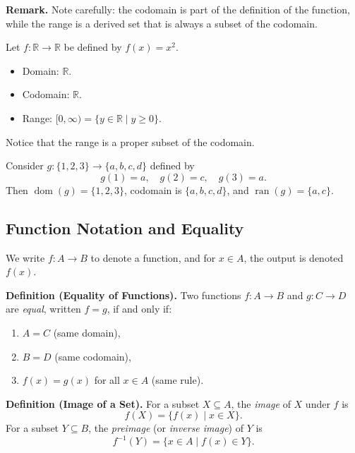 \documentclass[11pt,a4paper]{article}
\begin{document}
\textbf{Remark.} Note carefully: the codomain is part of the definition of the function, while the range is a derived set that is always a subset of the codomain.

\begin{example}
Let $f: \mathbb{R} \to \mathbb{R}$ be defined by $f(x) = x^2$.
\begin{itemize}[label=--]
    \item Domain: $\mathbb{R}$.
    \item Codomain: $\mathbb{R}$.
    \item Range: $[0, \infty) = \{y \in \mathbb{R} \mid y \geq 0\}$.
\end{itemize}
Notice that the range is a proper subset of the codomain.
\end{example}

\begin{example}
Consider $g: \{1, 2, 3\} \to \{a, b, c, d\}$ defined by
\begin{equation*}
    g(1) = a, \quad g(2) = c, \quad g(3) = a.
\end{equation*}
Then $\operatorname{dom}(g) = \{1, 2, 3\}$, codomain is $\{a, b, c, d\}$, and $\operatorname{ran}(g) = \{a, c\}$.
\end{example}

\subsection{Function Notation and Equality}

We write $f: A \to B$ to denote a function, and for $x \in A$, the output is denoted $f(x)$.

\textbf{Definition (Equality of Functions).} Two functions $f: A \to B$ and $g: C \to D$ are \textit{equal}, written $f = g$, if and only if:
\begin{enumerate}[label=(\roman*)]
    \item $A = C$ (same domain),
    \item $B = D$ (same codomain),
    \item $f(x) = g(x)$ for all $x \in A$ (same rule).
\end{enumerate}

\textbf{Definition (Image of a Set).} For a subset $X \subseteq A$, the \textit{image} of $X$ under $f$ is
\begin{equation*}
    f(X) = \{f(x) \mid x \in X\}.
\end{equation*}
For a subset $Y \subseteq B$, the \textit{preimage} (or \textit{inverse image}) of $Y$ is
\begin{equation*}
    f^{-1}(Y) = \{x \in A \mid f(x) \in Y\}.
\end{equation*}
\end{document}
